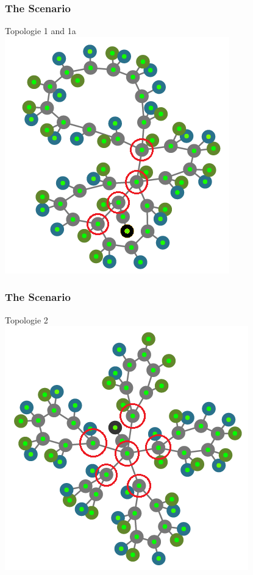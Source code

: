 \documentclass{beamer}
\begin{document}
\begin{frame}
	\frametitle{The Scenario}
	\centering
	Topologie 1 and 1a \\
	\includegraphics[height=0.8\textheight]{pics/topo_1_2.png}
\end{frame}

\begin{frame}
	\frametitle{The Scenario}
	\centering
	Topologie 2 \\
	\includegraphics[height=0.8\textheight]{pics/topo_3.png}
\end{frame}
\end{document}
